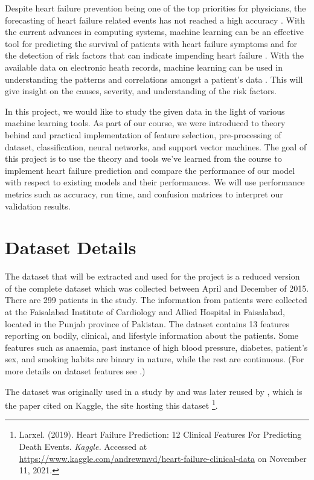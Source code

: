 \documentclass{article}
\begin{document}
Despite heart failure prevention being one of the top priorities for physicians, the forecasting of heart failure related events has not reached a high accuracy \citep{al2019clinical, dunn2007serum}. With the current advances in computing systems, machine learning can be an effective tool for predicting the survival of patients with heart failure symptoms and for the detection of risk factors that can indicate impending heart failure \citep{dunn2007serum}. With the available data on electronic heath records, machine learning can be used in understanding the patterns and correlations amongst a patient’s data \citep{awan2019machine}. This will give insight on the causes, severity, and understanding of the risk factors.

In this project, we would like to study the given data in the light of various machine learning tools. As part of our course, we were introduced to theory behind and practical implementation of feature selection, pre-processing of dataset, classification, neural networks, and support vector machines. The goal of this project is to use the theory and tools we've learned from the course to implement heart failure prediction and compare the performance of our model with respect to existing models and their performances. We will use performance metrics such as accuracy, run time, and confusion matrices to interpret our validation results.

\section{Dataset Details}

The dataset that will be extracted and used for the project is a reduced version of the complete dataset which was collected between April and December of 2015. There are 299 patients in the study. The information from patients were collected at the Faisalabad Institute of Cardiology and Allied Hospital in Faisalabad, located in the Punjab province of Pakistan. The dataset contains 13 features reporting on bodily, clinical, and lifestyle information about the patients. Some features such as anaemia, past instance of high blood pressure, diabetes, patient's sex, and smoking habits are binary in nature, while the rest are continuous. (For more details on dataset features see \citet{chicco2020machine}.) 

The dataset was originally used in a study by \citet{ahmad2017survival} and was later reused by \citet{chicco2020machine}, which is the paper cited on Kaggle, the site hosting this dataset \footnote{Larxel. (2019). Heart Failure Prediction: 12 Clinical Features For Predicting Death Events. \textit{Kaggle.} Accessed at \href{https://www.kaggle.com/andrewmvd/heart-failure-clinical-data}{https://www.kaggle.com/andrewmvd/heart-failure-clinical-data} on November 11, 2021.}.
\end{document}
